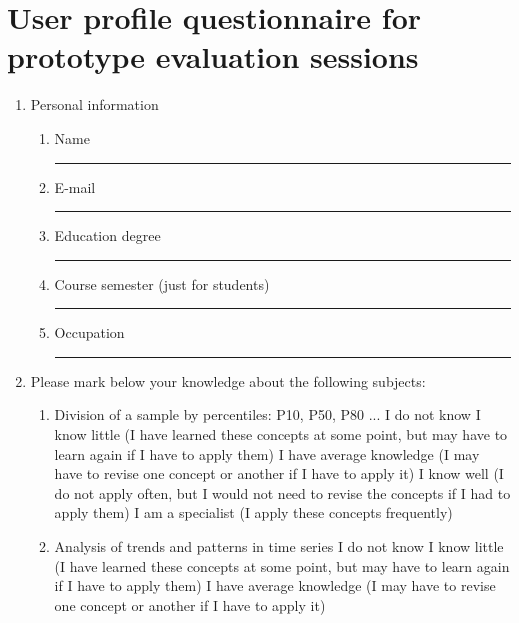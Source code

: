 \newpage

\chapter{User profile questionnaire for prototype evaluation sessions}
\label{chap:profile-form}

\begin{enumerate}
\item Personal information
  \begin{enumerate}
  \item Name
    \newline \rule[0pt]{300pt}{1pt}
  \item E-mail
    \newline \rule[0pt]{300pt}{1pt}
  \item Education degree
    \newline \rule[0pt]{300pt}{1pt}
  \item Course semester (just for students)
    \newline \rule[0pt]{300pt}{1pt}
  \item Occupation
    \newline \rule[0pt]{300pt}{1pt}
  \end{enumerate}
\item Please mark below your knowledge about the following subjects:
  \begin{enumerate}
  \item Division of a sample by percentiles: P10, P50, P80 ...
    \newline {} I do not know
    \newline {} I know little (I have learned these concepts at some point, but may have to learn again if I have to apply them)
    \newline {} I have average knowledge (I may have to revise one concept or another if I have to apply it)
    \newline {} I know well (I do not apply often, but I would not need to revise the concepts if I had to apply them)
    \newline {} I am a specialist (I apply these concepts frequently)
    \newline 
  \item Analysis of trends and patterns in time series
    \newline {} I do not know
    \newline {} I know little (I have learned these concepts at some point, but may have to learn again if I have to apply them)
    \newline {} I have average knowledge (I may have to revise one concept or another if I have to apply it)
  \end{enumerate}
\end{enumerate}